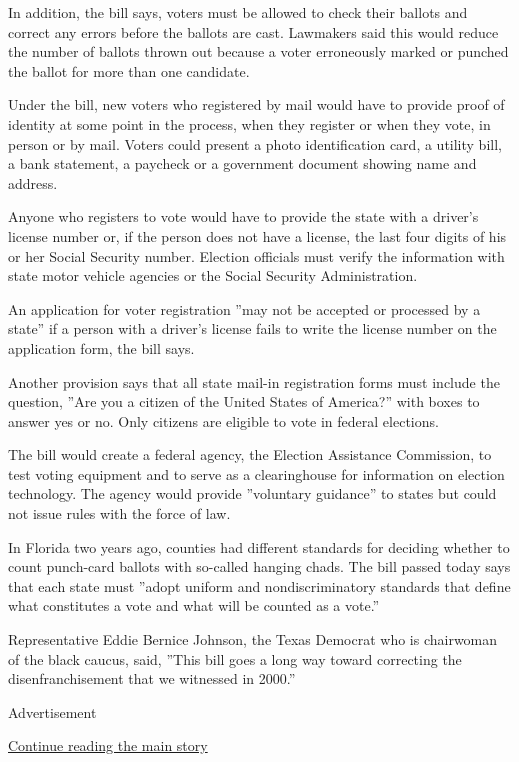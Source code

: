In addition, the bill says, voters must be allowed to check their
ballots and correct any errors before the ballots are cast. Lawmakers
said this would reduce the number of ballots thrown out because a voter
erroneously marked or punched the ballot for more than one candidate.

Under the bill, new voters who registered by mail would have to provide
proof of identity at some point in the process, when they register or
when they vote, in person or by mail. Voters could present a photo
identification card, a utility bill, a bank statement, a paycheck or a
government document showing name and address.

Anyone who registers to vote would have to provide the state with a
driver's license number or, if the person does not have a license, the
last four digits of his or her Social Security number. Election
officials must verify the information with state motor vehicle agencies
or the Social Security Administration.

An application for voter registration ''may not be accepted or processed
by a state'' if a person with a driver's license fails to write the
license number on the application form, the bill says.

Another provision says that all state mail-in registration forms must
include the question, ''Are you a citizen of the United States of
America?'' with boxes to answer yes or no. Only citizens are eligible to
vote in federal elections.

The bill would create a federal agency, the Election Assistance
Commission, to test voting equipment and to serve as a clearinghouse for
information on election technology. The agency would provide ''voluntary
guidance'' to states but could not issue rules with the force of law.

In Florida two years ago, counties had different standards for deciding
whether to count punch-card ballots with so-called hanging chads. The
bill passed today says that each state must ''adopt uniform and
nondiscriminatory standards that define what constitutes a vote and what
will be counted as a vote.''

Representative Eddie Bernice Johnson, the Texas Democrat who is
chairwoman of the black caucus, said, ''This bill goes a long way toward
correcting the disenfranchisement that we witnessed in 2000.''

Advertisement

\protect\hyperlink{after-bottom}{Continue reading the main story}

